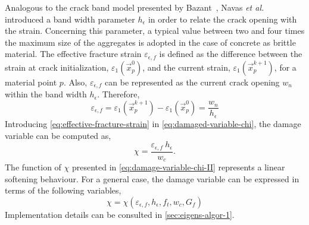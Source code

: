 \documentclass[preprint,12pt,a4paper]{elsarticle}
\begin{document}
Analogous to the crack band model presented by
Bazant~\cite{Bazant83}, Navas {\it et al.} \cite{Navas_2018_ES}
\cite{Navas_2017_ES} introduced a band width parameter $h_{\epsilon}$ in order to relate the crack opening with the strain.
Concerning this parameter, a typical value between two and
four times the maximum size of the aggregates is adopted in the case of
concrete as brittle material. The effective fracture strain
$\varepsilon_{\epsilon,f}$ is defined as the difference between the strain at crack initialization,
$\varepsilon_1(\vec{x}_p^{0})$, and the current strain, $\varepsilon_1(\vec{x}_p^{k+1})$, for a material point $p$. Also,
$\varepsilon_{\epsilon,f}$ can be represented as the current crack
opening $w_n$ within the band width $h_{\epsilon}$. Therefore, 
\begin{equation}
  \label{eq:effective-fracture-strain}
  \varepsilon_{\epsilon,f} = \varepsilon_1(\vec{x}_p^{k+1}) -
  \varepsilon_1(\vec{x}_p^{0}) = \frac{w_n}{h_{\epsilon}}
\end{equation}
Introducing \eqref{eq:effective-fracture-strain} in
\eqref{eq:damaged-variable-chi}, the damage variable can be computed
as,
\begin{equation}
  \label{eq:damage-variable-chi-II}
\chi = \frac{\varepsilon_{\epsilon,f}\ h_{\epsilon}}{w_c}.  
\end{equation}
The function of $\chi$ presented in \eqref{eq:damage-variable-chi-II}
represents a linear softening behaviour. For a general case, the
damage variable can be expressed in terms of the following variables,
\begin{equation}
  \label{eq:damage-variable-chi-III}
  \chi = \chi(\varepsilon_{\epsilon,f}, h_{\epsilon}, f_t, w_c, G_f)
\end{equation}
Implementation details can be consulted in \ref{sec:eigens-algor-1}.
\end{document}
